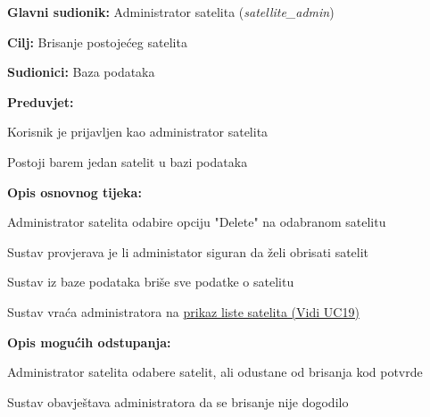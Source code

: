 					\noindent {}
				\begin{packed_item}
					
					\item \textbf{Glavni sudionik: }Administrator satelita (\textit{satellite\_admin})
					\item  \textbf{Cilj: }Brisanje postojećeg satelita
					\item  \textbf{Sudionici: }Baza podataka
					\item  \textbf{Preduvjet: }
					\begin{packed_enum}
						\item Korisnik je prijavljen kao administrator satelita
						\item Postoji barem jedan satelit u bazi podataka	\end{packed_enum}
					\item  \textbf{Opis osnovnog tijeka: }
					
					\item[] \begin{packed_enum}
						
						\item Administrator satelita odabire opciju "Delete" na odabranom satelitu
						\item Sustav provjerava je li administator siguran da želi obrisati satelit
						\item Sustav iz baze podataka briše sve podatke o satelitu 
						\item Sustav vraća administratora na \hyperref[UC19]{prikaz liste satelita (Vidi UC19) } 
						
					\end{packed_enum}
					
					\item  \textbf{Opis mogućih odstupanja: }
					
					\item[] \begin{packed_enum}
						
							\item[1] Administrator satelita odabere satelit, ali odustane od brisanja kod potvrde
						\item[ ] \begin{packed_enum}
							
							\item[1.1] Sustav obavještava administratora da se brisanje nije dogodilo
						\end{packed_enum}
					\end{packed_enum}
				\end{packed_item}
